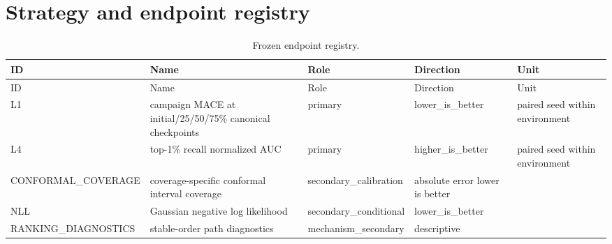 \documentclass[10pt]{article}
\begin{document}
\section{Strategy and endpoint registry}

\begingroup\scriptsize
\begin{longtable}{L{1.05in}L{1.8in}L{1.0in}L{1.35in}L{1.0in}}
\caption{Frozen endpoint registry.}\\
\toprule
ID & Name & Role & Direction & Unit\\
\midrule
\endfirsthead
\toprule
ID & Name & Role & Direction & Unit\\
\midrule
\endhead
L1 & campaign MACE at initial/25/50/75\% canonical checkpoints & primary & lower\_\allowbreak{}is\_\allowbreak{}better & paired seed within environment\\
L4 & top-1\% recall normalized AUC & primary & higher\_\allowbreak{}is\_\allowbreak{}better & paired seed within environment\\
CONFORMAL\_\allowbreak{}COVERAGE & coverage-specific conformal interval coverage & secondary\_\allowbreak{}calibration & absolute error lower is better & \\
NLL & Gaussian negative log likelihood & secondary\_\allowbreak{}conditional & lower\_\allowbreak{}is\_\allowbreak{}better & \\
RANKING\_\allowbreak{}DIAGNOSTICS & stable-order path diagnostics & mechanism\_\allowbreak{}secondary & descriptive & \\
\bottomrule
\end{longtable}
\endgroup
\end{document}
